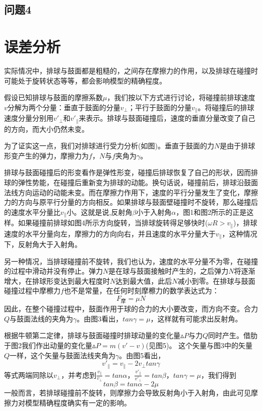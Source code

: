 \documentclass[withoutpreface,bwprint]{cumcmthesis} %
\begin{document}
\subsection{问题4}

\section{误差分析}

实际情况中，排球与鼓面都是粗糙的，之间存在摩擦力的作用，以及排球在碰撞时可能处于旋转状态等等，都会影响模型的精确程度。

假设已知排球与鼓面的摩擦系数$\mu$，我们按以下方式进行讨论，将碰撞前排球速度$v$分解为两个分量：垂直于鼓面的分量$v_\bot$；平行于鼓面的分量$v_\parallel$。将碰撞后的排球速度分量分别用$v'_\bot$和$v'_\parallel$来表示。排球与鼓面碰撞后，速度的垂直分量改变了自己的方向，而大小仍然未变。

为了证实这一点，我们对排球进行受力分析(如图)。垂直于鼓面的力$N$是由于排球形变产生的弹力，摩擦力为$f$，$N$与$f$夹角为$\gamma$。

排球与鼓面碰撞后的形变看作是弹性形变，碰撞后排球恢复了自己的形状，因而排球的弹性势能，在碰撞后重新变为排球的动能。换句话说，碰撞前后，排球沿鼓面法线方向运动的动能未变。而在摩擦力作用下，速度的平行分量发生了变化，摩擦力的方向与原平行分量的方向相反。如果排球与鼓面壁碰撞时不旋转，那么碰撞后的速度水平分量比$v_\parallel$小。这就是说,反射角$\beta$小于入射角$\alpha$，图1和图2所示的正是这样。如果碰撞前排球如图4所示方向旋转，当排球旋转得足够快时($\omega R>v_\parallel$)，排球速度的水平分量向左，摩擦力的方向向右，并且速度的水平分量大于$v_\parallel$，这种情况下，反射角大于入射角。

另一种情况，当排球碰撞前不旋转，我们也认为，速度的水平分量不为零，在碰撞的过程中滑动并没有停止。弹力$N$是在球与鼓面接触时产生的，之后弹力$N$将逐渐增大，在排球形变达到最大程度时$N$达到最大值，此后$N$减小到零。在排球与鼓面碰撞过程中摩檫力$f$也不是常量，在任何时刻摩檫力的数学表达式为：
\begin{equation*}
	F_\textrm{摩}=\mu N
\end{equation*}
因此，在整个碰撞过程中，鼓面作用于球的合力的大小要改变，而方向不变。合力$Q$与鼓面法线的夹角为$\gamma$。由图3看出，$tan\gamma=\mu$，这样就有可能求出反射角。

根据牛顿第二定律，排球与鼓面碰撞时排球动量的变化量$\vartriangle P$与力$Q$同时产生。借肋于图2我们作出动量的变化量$\vartriangle P=m(v'-v)$(见图5)。
这个矢量与图3中的矢量$Q$一样，这个矢量与鼓面法线夹角为$\gamma$。由图5看出，
\begin{equation*}
	v'_\parallel=v_\parallel-2v_\bot tan\gamma
\end{equation*}
等式两端同除以$v_\bot$，并考虑到$\frac{v_\parallel}{v_\bot}=tan\alpha$，$\frac{v'_\parallel}{v'_\bot}=tan\beta$，$tan\gamma=\mu$，我们得到
\begin{equation*}
	tan\beta=tan\alpha-2\mu
\end{equation*}
一般而言，若排球碰撞前不旋转，则摩擦力会导致反射角小于入射角，由此可见摩擦力对模型精确程度确实有一定的影响。
\end{document}
